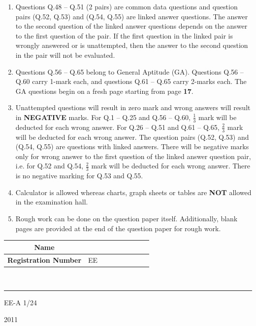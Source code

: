 \documentclass[a4paper,10pt]{exam}
\theoremstyle{remark}
\begin{document}
\begin{enumerate}[leftmargin=0.5cm,label=\arabic*.]
\item Questions Q.48 -- Q.51 (2 pairs) are common data questions and question pairs (Q.52, Q.53) and (Q.54, Q.55) are linked answer questions. The answer to the second question of the linked answer questions depends on the answer to the first question of the pair. If the first question in the linked pair is wrongly answered or is unattempted, then the answer to the second question in the pair will not be evaluated.
\item Questions Q.56 -- Q.65 belong to General Aptitude (GA). Questions Q.56 -- Q.60 carry 1-mark each, and questions Q.61 -- Q.65 carry 2-marks each. The GA questions begin on a fresh page starting from page \textbf{17}.
\item Unattempted questions will result in zero mark and wrong answers will result in \textbf{NEGATIVE} marks. For Q.1 -- Q.25 and Q.56 -- Q.60, $\frac{1}{3}$ mark will be deducted for each wrong answer. For Q.26 -- Q.51 and Q.61 -- Q.65, $\frac{2}{3}$ mark will be deducted for each wrong answer. The question pairs (Q.52, Q.53) and (Q.54, Q.55) are questions with linked answers. There will be negative marks only for wrong answer to the first question of the linked answer question pair, i.e. for Q.52 and Q.54, $\frac{2}{3}$ mark will be deducted for each wrong answer. There is no negative marking for Q.53 and Q.55.
\item Calculator is allowed whereas charts, graph sheets or tables are \textbf{NOT} allowed in the examination hall.
\item Rough work can be done on the question paper itself. Additionally, blank pages are provided at the end of the question paper for rough work.
\end{enumerate}
\begin{tabular}{|l|l|c|c|c|c|c|c|c|}
    \hline
    \multicolumn{1}{|c|}{\textbf{Name}} & \multicolumn{8}{l|}{} \\
    \hline
    \multicolumn{1}{|c|}{\textbf{Registration Number}} & \multicolumn{1}{c|}{EE} & & & & & & & \\
    \hline
\end{tabular}\\

\vspace{1cm}
\noindent\rule{\textwidth}{0.4pt}

\raggedright{EE-A}
\hfill
1/24

\newpage

\raggedright{2011}
\hfill
{}\\
\end{document}
